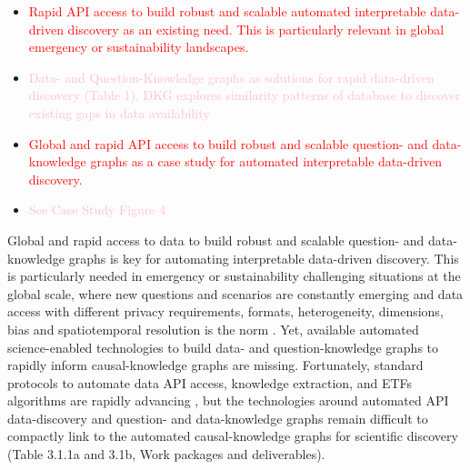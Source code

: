 \documentclass[11pt, a4paper]{article} %
\begin{document}
\begin{itemize}
      \item \textcolor{red}{Rapid API access to build
          robust and scalable automated interpretable data-driven
          discovery as an existing need. This is particularly relevant
          in global emergency or sustainability landscapes.}
      \item \textcolor{pink}{Data- and Question-Knowledge graphs as
          solutions for rapid data-driven discovery (Table 1). DKG
          explores similarity patterns of database to discover
          existing gaps in data availability}
      \item \textcolor{red}{Global and rapid API access to build
          robust and scalable question- and data-knowledge graphs as a
          case study for automated interpretable data-driven
          discovery.}
      \item \textcolor{pink}{See Case Study Figure 4}
      \end{itemize}
      
      Global and rapid access to data to build robust and scalable
      question- and data-knowledge graphs is key for automating
      interpretable data-driven discovery. This is particularly needed
      in emergency or sustainability challenging situations at the
      global scale, where new questions and scenarios are constantly
      emerging and data access with different privacy requirements,
      formats, heterogeneity, dimensions, bias and spatiotemporal
      resolution is the norm
      \citep{Openstreetmap,Bluecloud,HOT,Elixir}. Yet, available
      automated science-enabled technologies to build data- and
      question-knowledge graphs to rapidly inform causal-knowledge
      graphs are missing. Fortunately, standard protocols to automate
      data API access, knowledge extraction, and ETFs algorithms are
      rapidly advancing
      \citep{Fan2012,APISGURU,OpenKnowledgeFoundation}, but the
      technologies around automated API data-discovery and question-
      and data-knowledge graphs remain difficult to compactly link to
      the automated causal-knowledge graphs for scientific discovery
      (Table 3.1.1a and 3.1b, Work packages and deliverables).
      
\end{document}
